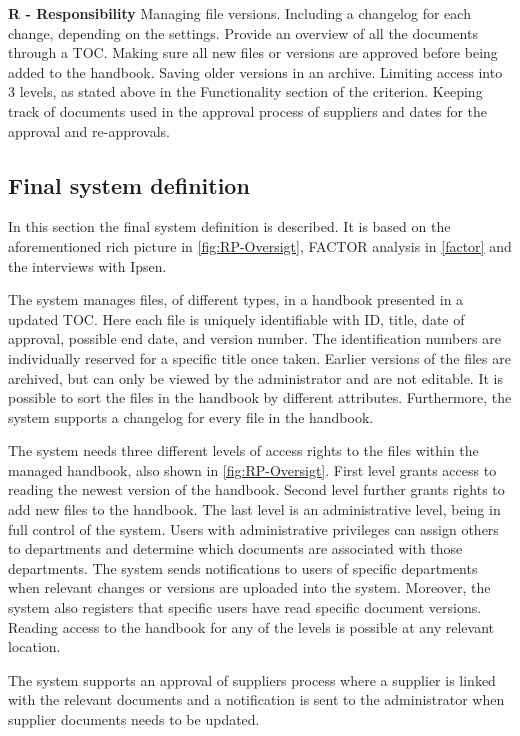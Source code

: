 \textbf{R  - Responsibility}
Managing file versions.
Including a changelog for each change, depending on the settings.
Provide an overview of all the documents through a TOC.
Making sure all new files or versions are approved before being added to the handbook.
Saving older versions in an archive.
Limiting access into 3 levels, as stated above in the Functionality section of the criterion.
Keeping track of documents used in the approval process of suppliers and dates for the approval and re-approvals.

\subsection{Final system definition}\label{sec:systemdefinition}
In this section the final system definition is described.
It is based on the aforementioned rich picture in \cref{fig:RP-Oversigt}, FACTOR analysis in \cref{factor} and the interviews with Ipsen.

The system manages files, of different types, in a handbook presented in a updated TOC.
Here each file is uniquely identifiable with ID, title, date of approval, possible end date, and version number.
The identification numbers are individually reserved for a specific title once taken.
Earlier versions of the files are archived, but can only be viewed by the administrator and are not editable.
It is possible to sort the files in the handbook by different attributes.
Furthermore, the system supports a changelog for every file in the handbook.

The system needs three different levels of access rights to the files within the managed handbook, also shown in \cref{fig:RP-Oversigt}.
First level grants access to reading the newest version of the handbook.
Second level further grants rights to add new files to the handbook.
The last level is an administrative level, being in full control of the system.
Users with administrative privileges can assign others to departments and determine which documents are associated with those departments.
The system sends notifications to users of specific departments when relevant changes or versions are uploaded into the system.
Moreover, the system also registers that specific users have read specific document versions.
Reading access to the handbook for any of the levels is possible at any relevant location.

The system supports an approval of suppliers process where a supplier is linked with the relevant documents and a notification is sent to the administrator when supplier documents needs to be updated.
